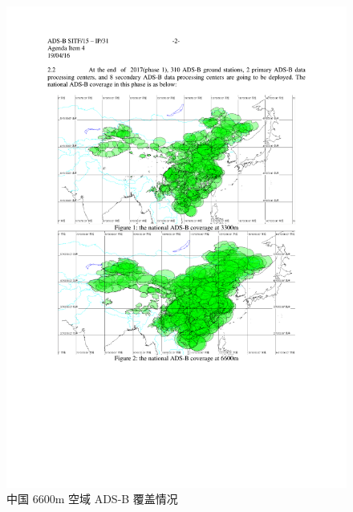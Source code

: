 \begin{figure}[!htb]
\centering
\includegraphics[width=13cm]{pic/china_6600m.pdf}
\caption{中国 6600m 空域 ADS-B 覆盖情况\protect\footnotemark}
\label{fig:china_6600m}
\end{figure}


